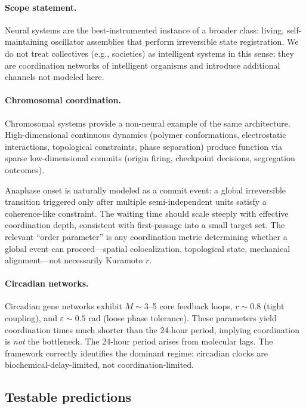 \documentclass[12pt]{article}
\begin{document}
\paragraph{Scope statement.} Neural systems are the best-instrumented instance of a broader class: living, self-maintaining oscillator assemblies that perform irreversible state registration. We do not treat collectives (e.g., societies) as intelligent systems in this sense; they are coordination networks of intelligent organisms and introduce additional channels not modeled here.

\paragraph{Chromosomal coordination.} Chromosomal systems provide a non-neural example of the same architecture. High-dimensional continuous dynamics (polymer conformations, electrostatic interactions, topological constraints, phase separation) produce function via sparse low-dimensional commits (origin firing, checkpoint decisions, segregation outcomes).

Anaphase onset is naturally modeled as a commit event: a global irreversible transition triggered only after multiple semi-independent units satisfy a coherence-like constraint. The waiting time should scale steeply with effective coordination depth, consistent with first-passage into a small target set. The relevant ``order parameter'' is any coordination metric determining whether a global event can proceed---spatial colocalization, topological state, mechanical alignment---not necessarily Kuramoto $r$.

\paragraph{Circadian networks.} Circadian gene networks exhibit $M \sim 3$--5 core feedback loops, $r \sim 0.8$ (tight coupling), and $\varepsilon \sim 0.5$ rad (loose phase tolerance). These parameters yield coordination times much shorter than the 24-hour period, implying coordination is \emph{not} the bottleneck. The 24-hour period arises from molecular lags. The framework correctly identifies the dominant regime: circadian clocks are biochemical-delay-limited, not coordination-limited.

\subsection{Testable predictions}
\end{document}
